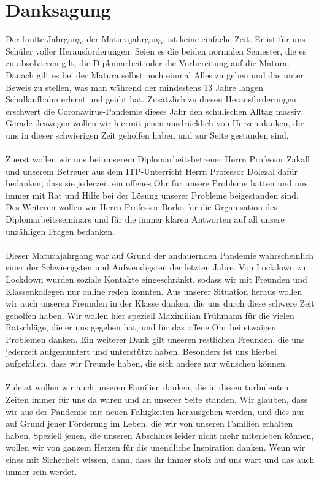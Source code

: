 \chapter{Danksagung} 
Der fünfte Jahrgang, der Maturajahrgang, ist keine einfache Zeit. Er ist für uns Schüler voller Herausforderungen. Seien es die beiden normalen Semester, die es zu absolvieren gilt, die Diplomarbeit oder die Vorbereitung auf die Matura. Danach gilt es bei der Matura selbst noch einmal Alles zu geben und das unter Beweis zu stellen, was man während der mindestens 13 Jahre langen Schullaufbahn erlernt und geübt hat. Zusätzlich zu diesen Herausforderungen erschwert die Coronavirus-Pandemie dieses Jahr den schulischen Alltag massiv. Gerade deswegen wollen wir hiermit jenen ausdrücklich von Herzen danken, die uns in dieser schwierigen Zeit geholfen haben und zur Seite gestanden sind.\\ 
~\\
Zuerst wollen wir uns bei unserem Diplomarbeitsbetreuer Herrn Professor Zakall und unserem Betreuer aus dem ITP-Unterricht Herrn Professor Dolezal dafür bedanken, dass sie jederzeit ein offenes Ohr für unsere Probleme hatten und uns immer mit Rat und Hilfe bei der Lösung unserer Probleme beigestanden sind. Des Weiteren wollen wir Herrn Professor Borko für die Organisation des Diplomarbeitsseminars und für die immer klaren Antworten auf all unsere unzähligen Fragen bedanken.\\
~\\
Dieser Maturajahrgang war auf Grund der andauernden Pandemie wahrscheinlich einer der Schwierigsten und Aufwendigsten der letzten Jahre. Von Lockdown zu Lockdown wurden soziale Kontakte eingeschränkt, sodass wir mit Freunden und Klassenkollegen nur online reden konnten. Aus unserer Situation heraus wollen wir auch unseren Freunden in der Klasse danken, die uns durch diese schwere Zeit geholfen haben. Wir wollen hier speziell Maximilian Frühmann für die vielen Ratschläge, die er uns gegeben hat, und für das offene Ohr bei etwaigen Problemen danken. Ein weiterer Dank gilt unseren restlichen Freunden, die uns jederzeit aufgemuntert und unterstützt haben. Besonders ist uns hierbei aufgefallen, dass wir Freunde haben, die sich andere nur wünschen können.\\
~\\
Zuletzt wollen wir auch unseren Familien danken, die in diesen turbulenten Zeiten immer für uns da waren und an unserer Seite standen. Wir glauben, dass wir aus der Pandemie mit neuen Fähigkeiten herausgehen werden, und dies nur auf Grund jener Förderung im Leben, die wir von unseren Familien erhalten haben. 
Speziell jenen, die unseren Abschluss leider nicht mehr miterleben können, wollen wir von ganzem Herzen für die unendliche Inspiration danken. Wenn wir eines mit Sicherheit wissen, dann, dass ihr immer stolz auf uns wart und das auch immer sein werdet.